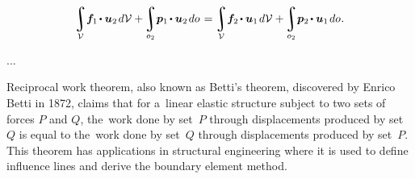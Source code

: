 \begin{otherlanguage}{russian}
\nopagebreak\vspace{1.5em}\begin{equation}\label{betti:reciprocalworktheorem}
\tikzmark{beginReciprocalFirstVariant} \scalebox{0.98}{$\displaystyle \integral\displaylimits_{\mathcal{V}} \hspace{-0.4ex} \bm{f}_1 \hspace{-0.2ex} \dotp \bm{u}_2 \hspace{.25ex} d\mathcal{V} $}
+ \hspace{-0.2ex}
\scalebox{0.98}{$\displaystyle \integral\displaylimits_{o_2} \hspace{-0.4ex} \bm{p}_1 \hspace{-0.2ex} \dotp \bm{u}_2 \hspace{.25ex} do $} \tikzmark{endReciprocalFirstVariant}
%
\hspace{.2ex} = \hspace{-0.1ex}
%
\tikzmark{beginReciprocalSecondVariant} \scalebox{0.98}{$\displaystyle \integral\displaylimits_{\mathcal{V}} \hspace{-0.4ex} \bm{f}_2 \hspace{-0.2ex} \dotp \bm{u}_1 \hspace{.25ex} d\mathcal{V} $}
+ \hspace{-0.2ex}
 \scalebox{0.98}{$\displaystyle \integral\displaylimits_{o_2} \hspace{-0.4ex} \bm{p}_2 \hspace{-0.2ex} \dotp \bm{u}_1 \hspace{.25ex} do $} \tikzmark{endReciprocalSecondVariant}
\hspace{.1ex} .
\end{equation}%
%

...

{\small
Reciprocal work theorem, also known as Betti’s theorem, discovered by Enrico Betti in 1872, claims that for a~linear elastic structure subject to two sets of forces $P$ and $Q$, the~work done by set~$P$ through displacements produced by set~$Q$ is equal to the~work done by set~$Q$ through displacements produced by set~$P$. This theorem has applications in structural engineering where it is used to define influence lines and derive the boundary element method.
\par}


\end{otherlanguage}
